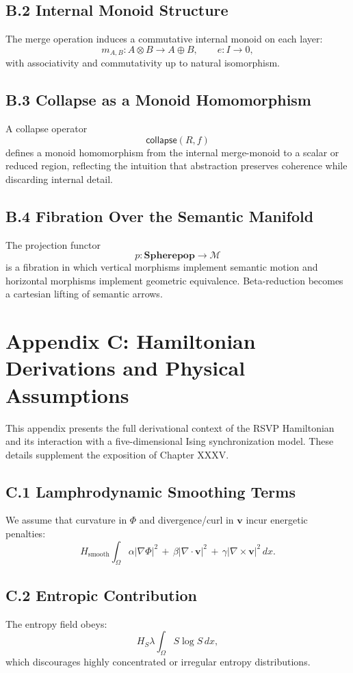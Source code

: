 \documentclass[12pt,letterpaper]{article}
\theoremstyle{remark}
\begin{document}
\subsection*{B.2 Internal Monoid Structure}
The merge operation induces a commutative internal monoid on each layer:
\[
m_{A,B} : A \otimes B \to A \oplus B,
\qquad
e : I \to 0,
\]
with associativity and commutativity up to natural isomorphism.

\subsection*{B.3 Collapse as a Monoid Homomorphism}
A collapse operator
\[
\mathsf{collapse}(R,f)
\]
defines a monoid homomorphism from the internal merge-monoid to a scalar or
reduced region, reflecting the intuition that abstraction preserves coherence
while discarding internal detail.

\subsection*{B.4 Fibration Over the Semantic Manifold}
The projection functor
\[
p : \mathbf{Spherepop} \to \mathcal{M}
\]
is a fibration in which vertical morphisms implement semantic motion and
horizontal morphisms implement geometric equivalence.  Beta-reduction becomes a
cartesian lifting of semantic arrows.


\section{Appendix C: Hamiltonian Derivations and Physical Assumptions}

This appendix presents the full derivational context of the RSVP Hamiltonian and
its interaction with a five-dimensional Ising synchronization model.  These
details supplement the exposition of Chapter XXXV.

\subsection*{C.1 Lamphrodynamic Smoothing Terms}
We assume that curvature in $\Phi$ and divergence/curl in $\mathbf{v}$ incur
energetic penalties:
\[
H_{\text{smooth}}
\int_{\Omega}
\alpha |\nabla\Phi|^2
\,+\,
\beta|\nabla\cdot\mathbf{v}|^2
\,+\,
\gamma|\nabla\times\mathbf{v}|^2
\,dx.
\]

\subsection*{C.2 Entropic Contribution}
The entropy field obeys:
\[
H_S
\lambda\int_{\Omega} S\log S \, dx,
\]
which discourages highly concentrated or irregular entropy distributions.
\end{document}
